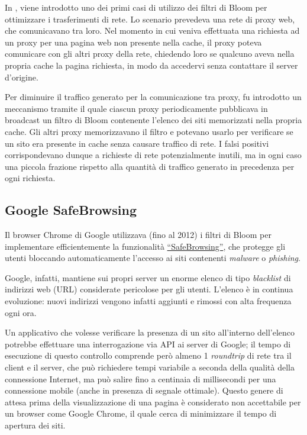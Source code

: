 In \cite{bloomproxy}, viene introdotto uno dei primi casi di utilizzo dei filtri di Bloom per
ottimizzare i trasferimenti di rete. Lo scenario prevedeva una rete di proxy web, che comunicavano
tra loro. Nel momento in cui veniva effettuata una richiesta ad un proxy per una pagina web non
presente nella cache, il proxy poteva comunicare con gli altri proxy della rete, chiedendo loro
se qualcuno aveva nella propria cache la pagina richiesta, in modo da accedervi senza contattare
il server d'origine.

Per diminuire il traffico generato per la comunicazione tra proxy, fu introdotto un meccanismo
tramite il quale ciascun proxy periodicamente pubblicava in broadcast un filtro di Bloom contenente
l'elenco dei siti memorizzati nella propria cache. Gli altri proxy memorizzavano il filtro e
potevano usarlo per verificare se un sito era presente in cache senza causare traffico di rete. I
falsi positivi corrispondevano dunque a richieste di rete potenzialmente inutili, ma in ogni caso
una piccola frazione rispetto alla quantità di traffico generato in precedenza per ogni richiesta.


\subsection{Google SafeBrowsing}

Il browser Chrome di Google utilizzava (fino al 2012) i filtri di Bloom per implementare
efficientemente la funzionalità \href{https://safebrowsing.google.com}{``SafeBrowsing''}, che
protegge gli utenti bloccando automaticamente l'accesso ai siti contenenti \emph{malware} o
\emph{phishing}.

Google, infatti, mantiene sui propri server un enorme elenco di tipo \emph{blacklist} di indirizzi
web (URL) considerate pericolose per gli utenti. L'elenco è in continua evoluzione: nuovi indirizzi
vengono infatti aggiunti e rimossi con alta frequenza ogni ora.

Un applicativo che volesse verificare la presenza di un sito all'interno dell'elenco potrebbe
effettuare una interrogazione via API ai server di Google; il tempo di esecuzione di questo
controllo comprende però almeno 1 \emph{roundtrip} di rete tra il client e il server, che può
richiedere tempi variabile a seconda della qualità della connessione Internet, ma può salire fino a
centinaia di millisecondi per una connessione mobile (anche in presenza di segnale ottimale). Questo
genere di attesa prima della visualizzazione di una pagina è considerato non accettabile per un
browser come Google Chrome, il quale cerca di minimizzare il tempo di apertura dei siti.

